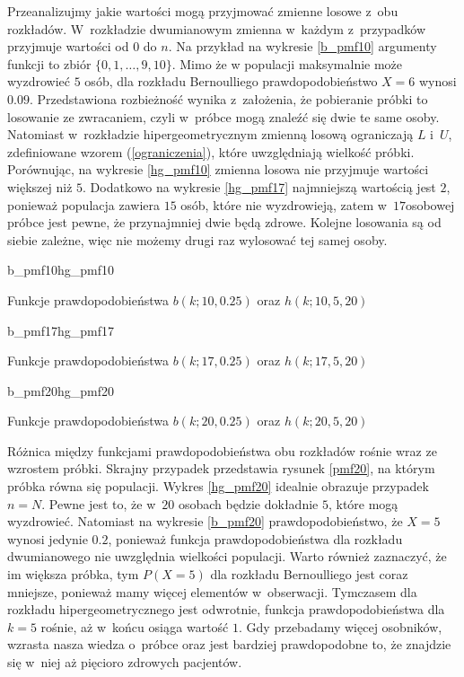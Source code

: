 Przeanalizujmy jakie wartości mogą przyjmować zmienne losowe z~obu rozkładów. W~rozkładzie dwumianowym zmienna w~każdym z~przypadków przyjmuje wartości od $0$ do $n$. Na przykład na wykresie \ref{b_pmf10} argumenty funkcji to zbiór $\{0,1,\ldots,9,10\}$. 
Mimo że w populacji maksymalnie może wyzdrowieć $5$ osób, dla rozkładu Bernoulliego prawdopodobieństwo $X=6$ wynosi $0.09$. Przedstawiona rozbieżność wynika z~założenia, że pobieranie próbki to losowanie ze zwracaniem, czyli w~próbce mogą znaleźć się dwie te same osoby. Natomiast w~rozkładzie hipergeometrycznym zmienną losową ograniczają $L$ i~$U$, zdefiniowane wzorem (\ref{ograniczenia}), które uwzględniają wielkość próbki. Porównując, na wykresie \ref{hg_pmf10} zmienna losowa nie przyjmuje wartości większej niż $5$. Dodatkowo na wykresie \ref{hg_pmf17} najmniejszą wartością jest $2$, ponieważ populacja zawiera $15$ osób, które nie wyzdrowieją, zatem w~$17$\dywiz osobowej próbce jest pewne, że przynajmniej dwie będą zdrowe. Kolejne losowania są od siebie zależne, więc nie możemy drugi raz wylosować tej samej osoby.

\begin{diagrams}{b_pmf10}{hg_pmf10}
	\caption{Funkcje prawdopodobieństwa $b(k;10,0.25)$ oraz $h(k;10,5,20)$}
	\label{pmf10}
\end{diagrams}

\begin{diagrams}{b_pmf17}{hg_pmf17}
	\caption{Funkcje prawdopodobieństwa $b(k;17,0.25)$ oraz $h(k;17,5,20)$}
	\label{pmf17}
\end{diagrams}

\begin{diagrams}{b_pmf20}{hg_pmf20}
	\caption{Funkcje prawdopodobieństwa $b(k;20,0.25)$ oraz $h(k;20,5,20)$}
	\label{pmf20}
\end{diagrams}

Różnica między funkcjami prawdopodobieństwa obu rozkładów rośnie wraz ze wzrostem próbki. Skrajny przypadek przedstawia rysunek \ref{pmf20}, na którym próbka równa się populacji. Wykres \ref{hg_pmf20} idealnie obrazuje przypadek $n=N$. Pewne jest to, że w~$20$ osobach będzie dokładnie $5$, które mogą wyzdrowieć. Natomiast na wykresie \ref{b_pmf20} prawdopodobieństwo, że $X=5$ wynosi jedynie $0.2$, ponieważ funkcja prawdopodobieństwa dla rozkładu dwumianowego nie uwzględnia wielkości populacji. Warto również zaznaczyć, że im większa próbka, tym $P(X=5)$ dla rozkładu Bernoulliego jest coraz mniejsze, ponieważ mamy więcej elementów w~obserwacji. Tymczasem dla rozkładu hipergeometrycznego jest odwrotnie, funkcja prawdopodobieństwa dla $k=5$ rośnie, aż w~końcu osiąga wartość $1$. Gdy przebadamy więcej osobników, wzrasta nasza wiedza o~próbce oraz jest bardziej prawdopodobne to, że znajdzie się w~niej aż pięcioro zdrowych pacjentów.

